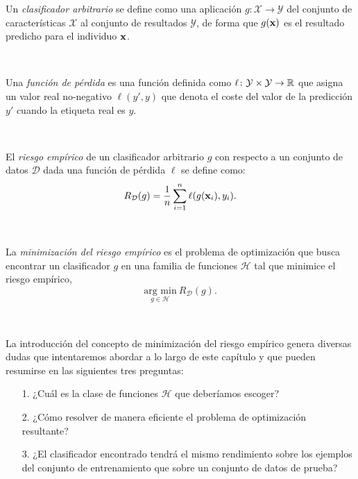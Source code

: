 \documentclass[oneside,openright,titlepage,numbers=noenddot,openany,headinclude,footinclude=true,
cleardoublepage=empty,abstractoff,BCOR=5mm,paper=a4,fontsize=12pt,main=spanish]{scrreprt}
\begin{document}
\begin{definition}
Un \textit{clasificador arbitrario} se define como una aplicación $g\colon \mathcal{X} \to \mathcal{Y}$ del conjunto de características $\mathcal{X}$ al conjunto de resultados $\mathcal{Y}$, de forma que $ g(\textbf{x})$ es el resultado predicho para el individuo $\textbf{x}$.
\end{definition}\

\begin{definition}
Una \textit{función de pérdida} es una función definida como $\ell \colon \mathcal{Y} \times \mathcal{Y} \to \mathbb{R}$ que asigna un valor real no-negativo $\ell(y',y)$ que denota el coste del valor de la predicción $y'$ cuando la etiqueta real es $y$.
\end{definition}\

\begin{definition}
El \textit{riesgo empírico} de un clasificador arbitrario $g$ con respecto a un conjunto de datos $\mathcal{D}$ dada una función de pérdida $\ell$ se define como: $$R_{\mathcal{D}}(g)=\frac{1}{n}\sum_{i=1}^n \ell(g(\textbf{x}_i),y_i).$$
\end{definition}\

\begin{definition} \label{def:minrisk}
La \textit{minimización del riesgo empírico} es el problema de optimización que busca encontrar un clasificador $g$ en una familia de funciones $\mathcal{H}$ tal que minimice el riesgo empírico, $$\underset{g\in \mathcal{H}}{\text{arg min}} \  R_{\mathcal{D}}(g).$$
\end{definition}\

La introducción del concepto de minimización del riesgo empírico genera diversas dudas que intentaremos abordar a lo largo de este capítulo y que pueden resumirse en las siguientes tres preguntas:

\begin{itemize}
    \item[1.] ¿Cuál es la clase de funciones $\mathcal{H}$ que deberíamos escoger?
    \item[2.] ¿Cómo resolver de manera eficiente el problema de optimización resultante?
    \item[3.] ¿El clasificador encontrado tendrá el mismo rendimiento sobre los ejemplos del conjunto de entrenamiento que sobre un conjunto de datos de prueba?
\end{itemize}
\end{document}
